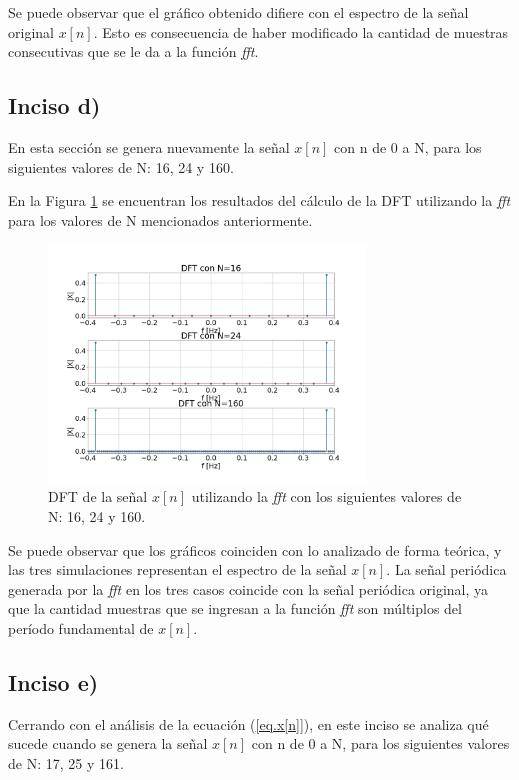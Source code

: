 \documentclass{article}
\begin{document}
Se puede observar que el gráfico obtenido difiere con el espectro de la señal original $x[n]$. Esto es consecuencia de haber modificado la cantidad de muestras consecutivas que se le da a la función \textit{fft}.

\subsection*{Inciso d)}
En esta sección se genera nuevamente la señal $x[n]$ con n de 0 a N, para los siguientes valores de N: 16, 24 y 160.


En la Figura \ref{fig.1d} se encuentran los resultados del cálculo de la DFT utilizando la \textit{fft} para los valores de N mencionados anteriormente. 

\begin{figure}[H]
\centering
\includegraphics[width=0.75\textwidth]{Img/punto_1_d.png}
\caption{DFT de la señal $x[n]$ utilizando la \textit{fft} con los siguientes valores de N: 16, 24 y 160.}
\label{fig.1d}
\end{figure}

Se puede observar que los gráficos coinciden con lo analizado de forma teórica, y las tres simulaciones representan el espectro de la señal $x[n]$. La señal periódica generada por la \textit{fft} en los tres casos coincide con la señal periódica original, ya que la cantidad muestras que se ingresan a la función \textit{fft} son múltiplos del período fundamental de $x[n]$.

\subsection*{Inciso e)}
Cerrando con el análisis de la ecuación (\ref{eq.x[n]}), en este inciso se analiza qué sucede cuando se genera la señal $x[n]$ con n de 0 a N, para los siguientes valores de N: 17, 25 y 161.
\end{document}
